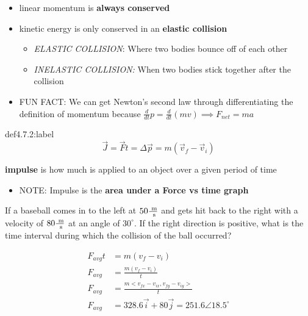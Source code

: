 \begin{itemize}
    \item linear momentum is \textbf{always conserved}
    \item kinetic energy is only conserved in an \textbf{elastic collision}
    \begin{itemize}
        \item \textit{ELASTIC COLLISION}: Where two bodies bounce off of each other
        \item \textit{INELASTIC COLLISION:} When two bodies stick together after the collision
    \end{itemize}
    \item FUN FACT: We can get Newton's second law through differentiating the definition of momentum because $\frac{d}{dt}p = \frac{d}{dt}(mv) \implies F_{net} = ma$
\end{itemize}

\begin{definition}[Impulse]{def4.7.2:label}
    \[
    \vec J = \vec Ft = \Delta \vec p = m(\vec v_f - \vec v_i)
    \]

    \textbf{impulse} is how much is applied to an object over a given period of time
\end{definition}

\begin{itemize}
    \item NOTE: Impulse is the \textbf{area under a Force vs time graph}
\end{itemize}


\begin{problem}
    If a baseball comes in to the left at $50 \frac{\text{ m}}{\text{ s}}$ and gets hit back to the right with a velocity of $80 \frac{\text{ m}}{\text{ s}}$ at an angle of $30^\circ$. If the right direction is positive, what is the time interval during which the collision of the ball occurred?

    \[
    \begin{aligned}
        F_{avg}t &= m(v_f-v_i)\\
        F_{avg} &= \frac{m(v_f-v_i)}{t}\\
        F_{avg} &= \frac{m<v_{fx} - v_{ix}, v_{fy}-v_{iy}>}{t}\\
        F_{avg} &= 328.6 \vec i + 80 \vec j = 251.6 \angle 18.5^\circ
    \end{aligned}    
    \]
\end{problem}


